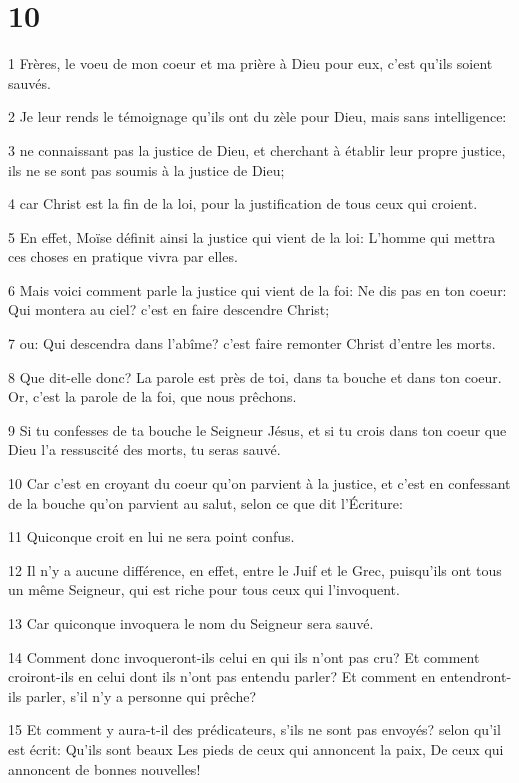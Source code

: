 \chapter{10}

\par 1 Frères, le voeu de mon coeur et ma prière à Dieu pour eux, c'est qu'ils soient sauvés.
\par 2 Je leur rends le témoignage qu'ils ont du zèle pour Dieu, mais sans intelligence:
\par 3 ne connaissant pas la justice de Dieu, et cherchant à établir leur propre justice, ils ne se sont pas soumis à la justice de Dieu;
\par 4 car Christ est la fin de la loi, pour la justification de tous ceux qui croient.
\par 5 En effet, Moïse définit ainsi la justice qui vient de la loi: L'homme qui mettra ces choses en pratique vivra par elles.
\par 6 Mais voici comment parle la justice qui vient de la foi: Ne dis pas en ton coeur: Qui montera au ciel? c'est en faire descendre Christ;
\par 7 ou: Qui descendra dans l'abîme? c'est faire remonter Christ d'entre les morts.
\par 8 Que dit-elle donc? La parole est près de toi, dans ta bouche et dans ton coeur. Or, c'est la parole de la foi, que nous prêchons.
\par 9 Si tu confesses de ta bouche le Seigneur Jésus, et si tu crois dans ton coeur que Dieu l'a ressuscité des morts, tu seras sauvé.
\par 10 Car c'est en croyant du coeur qu'on parvient à la justice, et c'est en confessant de la bouche qu'on parvient au salut, selon ce que dit l'Écriture:
\par 11 Quiconque croit en lui ne sera point confus.
\par 12 Il n'y a aucune différence, en effet, entre le Juif et le Grec, puisqu'ils ont tous un même Seigneur, qui est riche pour tous ceux qui l'invoquent.
\par 13 Car quiconque invoquera le nom du Seigneur sera sauvé.
\par 14 Comment donc invoqueront-ils celui en qui ils n'ont pas cru? Et comment croiront-ils en celui dont ils n'ont pas entendu parler? Et comment en entendront-ils parler, s'il n'y a personne qui prêche?
\par 15 Et comment y aura-t-il des prédicateurs, s'ils ne sont pas envoyés? selon qu'il est écrit: Qu'ils sont beaux Les pieds de ceux qui annoncent la paix, De ceux qui annoncent de bonnes nouvelles!
